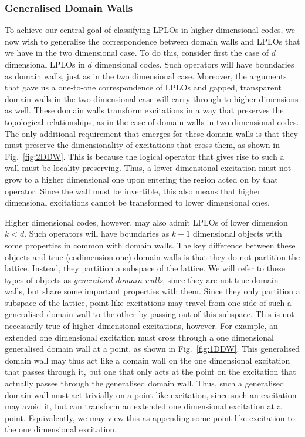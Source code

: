\documentclass[pra,twocolumn,a4paper,nofootinbib]{revtex4-1}
\begin{document}
\subsubsection{Generalised Domain Walls}
\label{IVA2}
To achieve our central goal of classifying LPLOs in higher dimensional codes, we now wish to generalise the correspondence between domain walls and LPLOs that we have in the two dimensional case. To do this, consider first the case of $d$ dimensional LPLOs in $d$ dimensional codes. Such operators will have boundaries as domain walls, just as in the two dimensional case. Moreover, the arguments that gave us a one-to-one correspondence of LPLOs and gapped, transparent domain walls in the two dimensional case will carry through to higher dimensions as well. These domain walls transform excitations in a way that preserves the topological relationships, as in the case of domain walls in two dimensional codes. The only additional requirement that emerges for these domain walls is that they must preserve the dimensionality of excitations that cross them, as shown in Fig.~\ref{fig:2DDW}. This is because the logical operator that gives rise to such a wall must be locality preserving. Thus, a lower dimensional excitation must not grow to a higher dimensional one upon entering the region acted on by that operator. Since the wall must be invertible, this also means that higher dimensional excitations cannot be transformed to lower dimensional ones.

Higher dimensional codes, however, may also admit LPLOs of lower dimension $k<d$. Such operators will have boundaries as $k-1$ dimensional objects with some properties in common with domain walls. The key difference between these objects and true (codimension one) domain walls is that they do not partition the lattice. Instead, they partition a subspace of the lattice. We will refer to these types of objects as \textit{generalised domain walls}, since they are not true domain walls, but share some important properties with them. Since they only partition a subspace of the lattice, point-like excitations may travel from one side of such a generalised domain wall to the other by passing out of this subspace. This is not necessarily true of higher dimensional excitations, however. For example, an extended one dimensional excitation must cross through a one dimensional generalised domain wall at a point, as shown in Fig.~\ref{fig:1DDW}. This generalised domain wall may thus act like a domain wall on the one dimensional excitation that passes through it, but one that only acts at the point on the excitation that actually passes through the generalised domain wall. Thus, such a generalised domain wall must act trivially on a point-like excitation, since such an excitation may avoid it, but can transform an extended one dimensional excitation at a point. Equivalently, we may view this as appending some point-like excitation to the one dimensional excitation.
\end{document}
